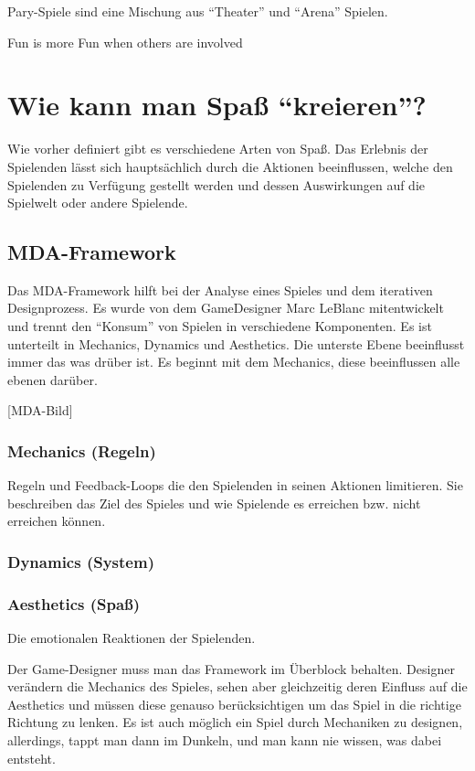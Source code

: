 Pary-Spiele sind eine Mischung aus "`Theater"' und "`Arena"' Spielen\cite[S. 65]{_art_of_gamedesign}. 

Fun is more Fun when others are involved

\section{Wie kann man Spaß "`kreieren"'?}

Wie vorher definiert gibt es verschiedene Arten von Spaß. Das Erlebnis der Spielenden lässt sich hauptsächlich durch die Aktionen beeinflussen, welche den Spielenden zu Verfügung gestellt werden und dessen Auswirkungen auf die Spielwelt oder andere Spielende.

\subsection{MDA-Framework}

Das MDA-Framework hilft bei der Analyse eines Spieles und dem iterativen Designprozess. Es wurde von dem GameDesigner Marc LeBlanc mitentwickelt und trennt den "`Konsum"' von Spielen in verschiedene Komponenten\cite{_mda}. Es ist unterteilt in Mechanics, Dynamics und Aesthetics. Die unterste Ebene beeinflusst immer das was drüber ist. Es beginnt mit dem Mechanics, diese beeinflussen alle ebenen darüber.

[MDA-Bild]

\subsubsection{Mechanics (Regeln)}

Regeln und Feedback-Loops die den Spielenden in seinen Aktionen limitieren. Sie beschreiben das Ziel des Spieles und wie Spielende es erreichen bzw. nicht erreichen können\cite[S.96]{_art_of_gamedesign}.

\subsubsection{Dynamics (System)}

\cite{_mda}

\subsubsection{Aesthetics (Spaß)}

Die emotionalen Reaktionen der Spielenden.

\break
\noindent Der Game-Designer muss man das Framework im Überblock behalten. Designer verändern die Mechanics des Spieles, sehen aber gleichzeitig deren Einfluss auf die Aesthetics und müssen diese genauso berücksichtigen um das Spiel in die richtige Richtung zu lenken. 
Es ist auch möglich ein Spiel durch Mechaniken zu designen, allerdings, tappt man dann im Dunkeln, und man kann nie wissen, was dabei entsteht. \cite[S.56]{_art_of_gamedesign}

